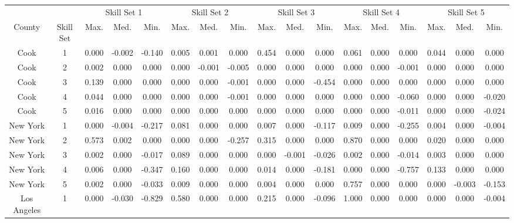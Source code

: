 
\centering
\begin{tabular}[t]{ccccccccccccccccc}
\toprule
\multicolumn{1}{c}{ } & \multicolumn{1}{c}{ } & \multicolumn{3}{c}{Skill Set 1} & \multicolumn{3}{c}{Skill Set 2} & \multicolumn{3}{c}{Skill Set 3} & \multicolumn{3}{c}{Skill Set 4} & \multicolumn{3}{c}{Skill Set 5} \\
\cmidrule(l{3pt}r{3pt}){3-5} \cmidrule(l{3pt}r{3pt}){6-8} \cmidrule(l{3pt}r{3pt}){9-11} \cmidrule(l{3pt}r{3pt}){12-14} \cmidrule(l{3pt}r{3pt}){15-17}
County & Skill Set & Max. & Med. & Min. & Max. & Med. & Min. & Max. & Med. & Min. & Max. & Med. & Min. & Max. & Med. & Min.\\
\midrule
Cook & 1 & 0.000 & -0.002 & -0.140 & 0.005 & 0.001 & 0.000 & 0.454 & 0.000 & 0.000 & 0.061 & 0.000 & 0.000 & 0.044 & 0.000 & 0.000\\
Cook & 2 & 0.002 & 0.000 & 0.000 & 0.000 & -0.001 & -0.005 & 0.000 & 0.000 & 0.000 & 0.000 & 0.000 & -0.001 & 0.000 & 0.000 & 0.000\\
Cook & 3 & 0.139 & 0.000 & 0.000 & 0.000 & 0.000 & -0.001 & 0.000 & 0.000 & -0.454 & 0.000 & 0.000 & 0.000 & 0.000 & 0.000 & 0.000\\
Cook & 4 & 0.044 & 0.000 & 0.000 & 0.000 & 0.000 & -0.001 & 0.000 & 0.000 & 0.000 & 0.000 & 0.000 & -0.060 & 0.000 & 0.000 & -0.020\\
Cook & 5 & 0.016 & 0.000 & 0.000 & 0.000 & 0.000 & 0.000 & 0.000 & 0.000 & 0.000 & 0.000 & 0.000 & -0.011 & 0.000 & 0.000 & -0.024\\
New York & 1 & 0.000 & -0.004 & -0.217 & 0.081 & 0.000 & 0.000 & 0.007 & 0.000 & -0.117 & 0.009 & 0.000 & -0.255 & 0.004 & 0.000 & -0.004\\
New York & 2 & 0.573 & 0.002 & 0.000 & 0.000 & 0.000 & -0.257 & 0.315 & 0.000 & 0.000 & 0.870 & 0.000 & 0.000 & 0.020 & 0.000 & 0.000\\
New York & 3 & 0.002 & 0.000 & -0.017 & 0.089 & 0.000 & 0.000 & 0.000 & -0.001 & -0.026 & 0.002 & 0.000 & -0.014 & 0.003 & 0.000 & 0.000\\
New York & 4 & 0.006 & 0.000 & -0.347 & 0.160 & 0.000 & 0.000 & 0.014 & 0.000 & -0.181 & 0.000 & 0.000 & -0.757 & 0.133 & 0.000 & 0.000\\
New York & 5 & 0.002 & 0.000 & -0.033 & 0.009 & 0.000 & 0.000 & 0.004 & 0.000 & 0.000 & 0.757 & 0.000 & 0.000 & 0.000 & -0.003 & -0.153\\
Los Angeles & 1 & 0.000 & -0.030 & -0.829 & 0.580 & 0.000 & 0.000 & 0.215 & 0.000 & -0.096 & 1.000 & 0.000 & 0.000 & 0.000 & 0.000 & -0.004\\

\end{tabular}
